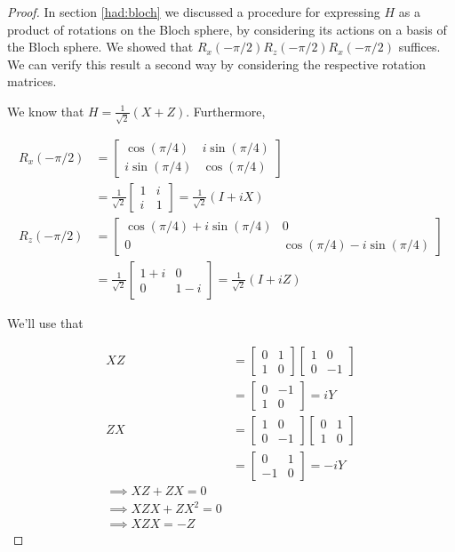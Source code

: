\documentclass[main.tex]{subfiles}
\begin{document}
\begin{subappendices}
\begin{exercise}
\begin{proof}
	In section \ref{had:bloch} we discussed a procedure for expressing $H$ as a product of rotations on the Bloch sphere, by considering its actions on a basis of the Bloch sphere. We showed that $R_x(-\pi / 2)R_z(-\pi / 2)R_x(-\pi / 2)$ suffices. We can verify this result a second way by considering the respective rotation matrices. 
	 
	We know that $H = \frac{1}{\sqrt{2}} (X + Z)$. Furthermore, 
	
	\begin{align*}
	R_x(-\pi / 2) &= \begin{bmatrix}
 \cos(\pi / 4) & i\sin(\pi / 4) \\ i\sin(\pi / 4) & \cos(\pi / 4)	
 \end{bmatrix} \\
&= \frac{1}{\sqrt{2}} \begin{bmatrix}
 	1 & i \\ i & 1 
 \end{bmatrix} = \frac{1}{\sqrt{2}}( I + iX) \\
 R_z(-\pi / 2) &= \begin{bmatrix}
 \cos(\pi / 4) + i\sin(\pi / 4) & 0 \\ 0 & \cos(\pi / 4)	 - i\sin (\pi / 4)
 \end{bmatrix} \\
&= \frac{1}{\sqrt{2}} \begin{bmatrix}
 	1 + i & 0 \\ 0 & 1-i
 \end{bmatrix} = \frac{1}{\sqrt{2}}( I + iZ)
\end{align*}

We'll use that 

\begin{align*}
XZ &= \begin{bmatrix}0 & 1 \\ 1 & 0\end{bmatrix}	\begin{bmatrix}1 & 0 \\ 0 & -1\end{bmatrix}	\\
&= \begin{bmatrix} 0 & -1 \\ 1 & 0 \end{bmatrix} = iY \\
ZX &= \begin{bmatrix}1 & 0 \\ 0 & -1\end{bmatrix}\begin{bmatrix}0 & 1 \\ 1 & 0\end{bmatrix} \\
&= \begin{bmatrix} 0 & 1 \\ -1 & 0 \end{bmatrix} = -iY \\
\implies XZ + ZX = 0 \\
\implies XZX + ZX^2 = 0 \\
\implies XZX = -Z 
\end{align*}


\end{proof}
\end{exercise}
\end{subappendices}
\end{document}
